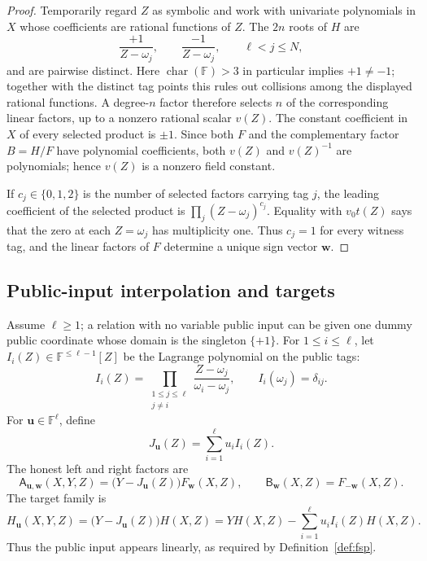 \documentclass[11pt]{article}
\theoremstyle{definition}
\newcommand{\F}{\mathbb F}
\begin{document}
\begin{proof}
Temporarily regard $Z$ as symbolic and work with univariate polynomials in
$X$ whose coefficients are rational functions of $Z$.  The $2n$ roots of
$H$ are
\[
  \frac{+1}{Z-\omega_j},
  \qquad
  \frac{-1}{Z-\omega_j},
  \qquad \ell<j\le N,
\]
and are pairwise distinct.  Here $\operatorname{char}(\F)>3$ in
particular implies $+1\ne-1$; together with the distinct tag points this rules
out collisions among the displayed rational functions.  A degree-$n$ factor
therefore selects $n$ of the corresponding linear factors, up to a nonzero
rational scalar $v(Z)$.
The constant coefficient in $X$ of every selected product is $\pm1$.
Since both $F$ and the complementary factor $B=H/F$ have polynomial
coefficients, both $v(Z)$ and $v(Z)^{-1}$ are polynomials; hence $v(Z)$ is a
nonzero field constant.

If $c_j\in\{0,1,2\}$ is the number of selected factors carrying tag $j$, the
leading coefficient of the selected product is
$\prod_j(Z-\omega_j)^{c_j}$.  Equality with $v_0t(Z)$ says that the zero at
each $Z=\omega_j$ has multiplicity one.  Thus $c_j=1$ for every witness tag,
and the linear factors of $F$ determine a unique sign vector $\mathbf w$.
\end{proof}

\subsection{Public-input interpolation and targets}

Assume $\ell\ge1$; a relation with no variable public input can be given one
dummy public coordinate whose domain is the singleton $\{+1\}$.  For
$1\le i\le\ell$, let
$I_i(Z)\in\F^{\le\ell-1}[Z]$ be the Lagrange polynomial on the public tags:
\begin{equation}
  I_i(Z)=
  \prod_{\substack{1\le j\le\ell\\j\ne i}}
  \frac{Z-\omega_j}{\omega_i-\omega_j},
  \qquad
  I_i(\omega_j)=\delta_{ij}.
  \label{eq:fsp-public-lagrange}
\end{equation}
For $\mathbf u\in\F^\ell$, define
\begin{equation}
  J_{\mathbf u}(Z)=\sum_{i=1}^{\ell}u_iI_i(Z).
  \label{eq:fsp-public-interpolant}
\end{equation}
The honest left and right factors are
\begin{equation}
  \mathsf A_{\mathbf u,\mathbf w}(X,Y,Z)
  =\bigl(Y-J_{\mathbf u}(Z)\bigr)F_{\mathbf w}(X,Z),
  \qquad
  \mathsf B_{\mathbf w}(X,Z)=F_{-\mathbf w}(X,Z).
  \label{eq:fsp-honest-factors}
\end{equation}
The target family is
\begin{equation}
  H_{\mathbf u}(X,Y,Z)
  =\bigl(Y-J_{\mathbf u}(Z)\bigr)H(X,Z)
  =YH(X,Z)-\sum_{i=1}^{\ell}u_iI_i(Z)H(X,Z).
  \label{eq:fsp-concrete-target}
\end{equation}
Thus the public input appears linearly, as required by Definition~\ref{def:fsp}.
\end{document}
